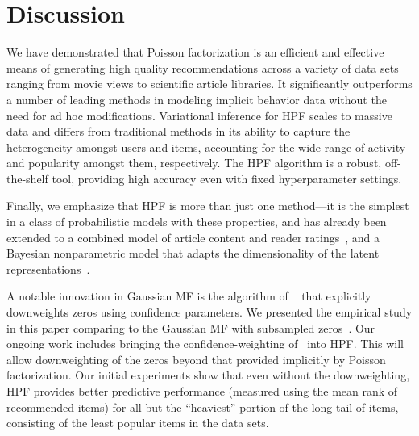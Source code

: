 \section{Discussion}
We have demonstrated that Poisson factorization is an efficient and
effective means of generating high quality recommendations across a
variety of data sets ranging from movie views to scientific article
libraries. It significantly outperforms a number of leading methods in
modeling implicit behavior data without the need for ad hoc
modifications. Variational inference for HPF scales to massive data
and differs from traditional methods in its ability to capture the
heterogeneity amongst users and items, accounting for the wide range
of activity and popularity amongst them, respectively. The HPF
algorithm is a robust, off-the-shelf tool, providing high accuracy
even with fixed hyperparameter settings.


Finally, we emphasize that HPF is more than just one method---it is
the simplest in a class of probabilistic models with these properties,
and has already been extended to a combined model of article content
and reader ratings~\cite{gopalan2014content}, and a Bayesian
nonparametric model that adapts the dimensionality of the latent
representations~\cite{gopalan2014bayesian}.

A notable innovation in Gaussian MF is the algorithm of
~\cite{Hu:2008p9402} that explicitly downweights zeros using
confidence parameters. We presented the empirical study in this paper
comparing to the Gaussian MF with subsampled
zeros~\cite{Koren:2009}. Our ongoing work includes bringing the
confidence-weighting of~\cite{Hu:2008p9402} into HPF.
This will allow downweighting of the zeros beyond that provided
implicitly by Poisson factorization. Our initial experiments show that
even without the downweighting, HPF provides better predictive
performance (measured using the mean rank of recommended items) for
all but the ``heaviest'' portion of the long tail of items, consisting
of the least popular items in the data sets.


